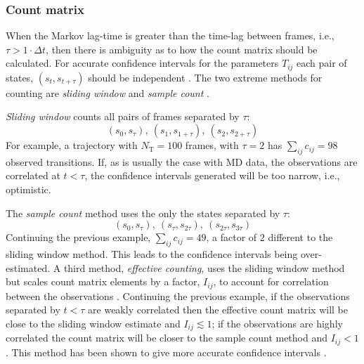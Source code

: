 \subsubsection{Count matrix}\label{sec:theory_count_mat}
When the Markov lag-time is greater than the time-lag between frames, i.e., $\tau > 1\cdot \Delta t$, then there is ambiguity as to how the count matrix should be calculated. For accurate confidence intervals for the parameters $T_{ij}$ each pair of states, $(s_{t}, s_{t+\tau})$ should be independent \cite{trendelkamp-schroerEstimationUncertaintyReversible2015b}. The two extreme methods for counting are \emph{sliding window} and \emph{sample count} \cite{trendelkamp-schroerEstimationUncertaintyReversible2015b}. 

\emph{Sliding window} counts all pairs of frames separated by $\tau$: 
\begin{equation*}
    (s_0, s_{\tau}),\ (s_1, s_{1+\tau}),\ (s_2, s_{2+\tau})
\end{equation*}
For example, a trajectory with $N_{\mathrm{T}}=100$ frames, with $\tau=2$ has $\sum_{ij}c_{ij}=98$ observed transitions. If, as is usually the case with MD data, the observations are correlated at $t < \tau$, the confidence intervals generated will be too narrow, i.e., optimistic. 

The \emph{sample count} method uses the only the states separated by $\tau$:
\begin{equation*}
    (s_{0}, s_{\tau}),\ (s_{\tau}, s_{2\tau}),\ (s_{2\tau}, s_{3\tau})
\end{equation*}
Continuing the previous example, $\sum_{ij}c_{ij}=49$, a factor of $2$ different to the sliding window method. This leads to the confidence intervals being over-estimated. A third method, \emph{effective counting}, uses the sliding window method but scales count matrix elements by a factor, $I_{ij}$, to account for correlation between the observations \cite{noeStatisticalInefficiencyMarkov,trendelkamp-schroerEstimationUncertaintyReversible2015b}. Continuing the previous example, if the observations separated by $t<\tau$ are weakly correlated then the effective count matrix will be close to the sliding window estimate and $I_{ij} \lesssim 1$; if the observations are highly correlated the count matrix will be closer to the sample count method and $I_{ij}<1$. This method has been shown to give more accurate confidence intervals \cite{trendelkamp-schroerEstimationUncertaintyReversible2015b}. 

